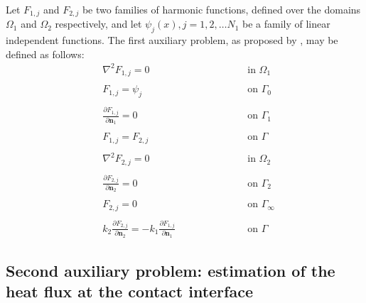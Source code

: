 \documentclass[12pt]{CHT-20}
\begin{document}
Let $F_{1,j}$ and $F_{2,j}$ be two families of harmonic functions, defined over the domains $\Omega_1$ and $\Omega_2$ respectively, and let $\psi_j(x), j=1,2,\ldots N_1$ be a family of linear independent functions. The first auxiliary problem, as proposed by \cite{artigo_abreu_3}, may be defined as follows:
\begin{subequations}
	\begin{alignat}{2}
	& \nabla^2 F_{1,j} = 0 \quad\quad\quad\quad\quad && \text{ in } \Omega_1 \label{funcao_F_harm_T1} \\ \nonumber \\
	& F_{1,j} = \psi_j && \text{ on } \Gamma_0  \label{funcao_F_cc_T1_2} \\ \nonumber \\
	& \frac{\partial F_{1,j}}{\partial \mathbf{n}_1} = 0 && \text{ on }  \Gamma_1 \label{funcao_F_cc_T1_1} \\  \nonumber \\
	& F_{1,j} = F_{2, j} \quad\quad\quad\quad\quad\quad\quad\quad && \text{ on }  \Gamma \label{funcao_F_cc_grad_T1} \\ \nonumber \\
	& \nabla^2 F_{2,j} = 0 && \text{ in }  \Omega_2 \label{funcao_F_harm_T2} \\ \nonumber \\
	& \frac{\partial F_{2,j}}{\partial \mathbf{n}_2} = 0 && \text{ on }  \Gamma_2 \label{funcao_F_cc_T1_3} \\ \nonumber \\
	& F_{2,j} = 0 && \text{ on }  \Gamma_\infty \label{funcao_F_cc_T1_4} \\ \nonumber \\
	& k_2\frac{\partial F_{2, j}}{\partial\mathbf{n}_2} = - k_1\frac{\partial F_{1,j}}{\partial\mathbf{n}_1} && \text{ on }  \Gamma \label{funcao_F_cc_T1_5}
	\end{alignat}
\end{subequations}

\subsection*{Second auxiliary problem: estimation of the heat flux at the contact interface}
\end{document}

